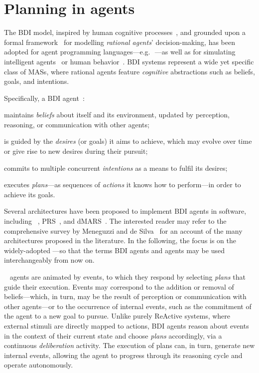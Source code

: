 \documentclass[12pt,a4paper,openright,twoside]{book}
\begin{document}
\section{Planning in \agentspeak{} agents}\label{sec:bdi-agents}

The \ac{BDI} model, inspired by human cognitive processes~\cite{BratmanEtAl1987}, and grounded upon a formal framework~\cite{bdilogic-jlc8} for modelling \emph{rational agents}' decision-making, has been adopted for agent programming languages---e.g.\,~\cite{BordiniHW2007}---as well as for simulating intelligent agents~\cite{HubnerB09} or human behavior~\cite{AdamGaudou2016}.
%
\ac{BDI} systems represent a wide yet specific class of \acp{MAS}, where rational agents feature \emph{cognitive} abstractions such as beliefs, goals, and intentions.

Specifically, a \ac{BDI} agent~\cite{RaoG95}:
%
\begin{inlinelist}
    \item maintains \emph{beliefs} about itself and its environment,
    updated by perception, reasoning, or communication with other agents;
    \item is guided by the \emph{desires} (or goals) it aims to achieve,
    which may evolve over time or give rise to new desires during their pursuit;
    \item commits to multiple concurrent \emph{intentions} as a means to fulfil its desires;
    \item executes \emph{plans}---as sequences of \emph{actions} it knows how to perform---in  order to achieve its goals.
\end{inlinelist}

Several architectures have been proposed to implement \ac{BDI} agents in software, including \agentspeak{}~\cite{RaoG95}, \ac{PRS}~\cite{IngrandGR1992}, and \ac{dMARS}~\cite{DInvernoLGKW04}.
%
The interested reader may refer to the comprehensive survey by Meneguzzi and de Silva~\cite{silvaBDIAgentArchitectures2020} for an account of the many architectures proposed in the literature.
%
In the following, the focus is on the widely-adopted \agentspeak{}---so that the terms \ac{BDI} agents and \agentspeak{} agents may be used interchangeably from now on.

\agentspeak{}~\cite{RaoG95} agents are animated by events, to which they respond by selecting \emph{plans} that guide their execution.
%
Events may correspond to the addition or removal of beliefs---which, in turn, may be the result of perception or communication with other agents---or to the occurrence of internal events, such as the commitment of the agent to a new goal to pursue.
%
Unlike purely \ac{ReAct}ive systems, where external stimuli are directly mapped to actions, \ac{BDI} agents reason about events in the context of their current state and choose \emph{plans} accordingly, via a continuous \emph{deliberation} activity.
%
The execution of plans can, in turn, generate new internal events, allowing the agent to progress through its reasoning cycle and operate autonomously.
\end{document}
